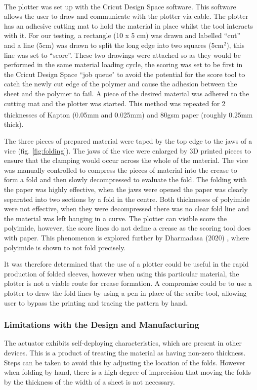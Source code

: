 The plotter was set up with the Cricut\textsuperscript{\textregistered} Design Space software. This software allows the user to draw and communicate with the plotter via cable. The plotter has an adhesive cutting mat to hold the material in place whilst the tool interacts with it. For our testing, a rectangle (10 x 5 cm) was drawn and labelled ``cut'' and a line (5cm) was drawn to split the long edge into two squares (5cm$^2$), this line was set to ``score''. These two drawings were attached so as they would be performed in the same material loading cycle, the scoring was set to be first in the Cricut Design Space ``job queue" to avoid the potential for the score tool to catch the newly cut edge of the polymer and cause the adhesion between the sheet and the polymer to fail. A piece of the desired material was adhered to the cutting mat and the plotter was started. This method was repeated for 2 thicknesses of Kapton\textsuperscript{\textregistered} (0.05mm and 0.025mm) and 80gsm paper (roughly 0.25mm thick). 

The three pieces of prepared material were taped by the top edge to the jaws of a vice (fig. \ref{fig:folding}). The jaws of the vice were enlarged by 3D printed pieces to ensure that the clamping would occur across the whole of the material. The vice was manually controlled to compress the pieces of material into the crease to form a fold and then slowly decompressed to evaluate the fold. The folding with the paper was highly effective, when the jaws were opened the paper was clearly separated into two sections by a fold in the centre. Both thicknesses of polyimide were not effective, when they were decompressed there was no clear fold line and the material was left hanging in a curve. The plotter can visible score the polyimide, however, the score lines do not define a crease as the scoring tool does with paper. This phenomenon is explored further by Dharmadasa (2020) \cite{dharmadasa2020characterizing}, where polyimide is shown to not fold precisely.

It was therefore determined that the use of a plotter could be useful in the rapid production of folded sleeves, however when using this particular material, the plotter is not a viable route for crease formation. A compromise could be to use a plotter to draw the fold lines by using a pen in place of the scribe tool, allowing user to bypass the printing and tracing the pattern by hand. 

\subsubsection{Limitations with the Design and Manufacturing}
The actuator exhibits self-deploying characteristics, which are present in other devices. This is a product of treating the material as having non-zero thickness\cite{reid2017geometry}. Steps can be taken to avoid this by adjusting the location of the folds. However when folding by hand, there is a high degree of imprecision that moving the folds by the thickness of the width of a sheet is not necessary\cite{misseroni2024origami}.  

